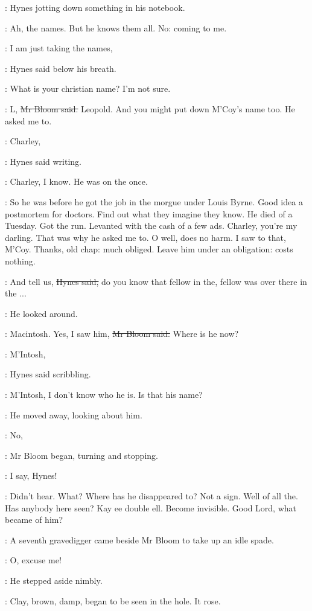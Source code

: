 :
Hynes jotting down something in his notebook.

\BloomInt:
Ah, the names.
But he knows them all.
No:
coming to me.

\hynes:
I am just taking the names,

:
Hynes said below his breath.

\hynes:
What is your christian name?
I'm not sure.

\Bloom:
L,
\sout{Mr Bloom said.}
Leopold.
And you might put down M'Coy's name too.
He asked me to.

\hynes:
Charley,

:
Hynes said writing.

\hynes:
Charley,
I know.
He was on the  once.

\BloomInt:
So he was before he got the job in the morgue under Louis Byrne.
Good idea a postmortem for doctors.
Find out what they imagine they know.
He died of a Tuesday.
Got the run.
Levanted with the cash of a few ads.
Charley, you're my darling.
That was why he asked me to.
O well, does no harm.
I saw to that, M'Coy.
Thanks, old chap:
much obliged.
Leave him under an obligation:
costs nothing.

\hynes:
And tell us,
\sout{Hynes said,}
do you know that fellow in the,
fellow was over there in the ...

:
He looked around.

\Bloom:
Macintosh.
Yes, I saw him,
\sout{Mr Bloom said.}
Where is he now?

\hynes:
M'Intosh,

:
Hynes said scribbling.

\hynes:
M'Intosh,
I don't know who he is.
Is that his name?

:
He moved away, looking about him.

\Bloom:
No,

:
Mr Bloom began, turning and stopping.

\Bloom:
I say, Hynes!

\BloomInt:
Didn't hear.
What?
Where has he disappeared to?
Not a sign.
Well of all the.
Has anybody here seen?
Kay ee double ell.
Become invisible.
Good Lord, what became of him?

:
A seventh gravedigger came beside Mr Bloom to take up an idle spade.

\Bloom:
O, excuse me!

:
He stepped aside nimbly.

:
Clay, brown, damp, began to be seen in the hole.
It rose.

